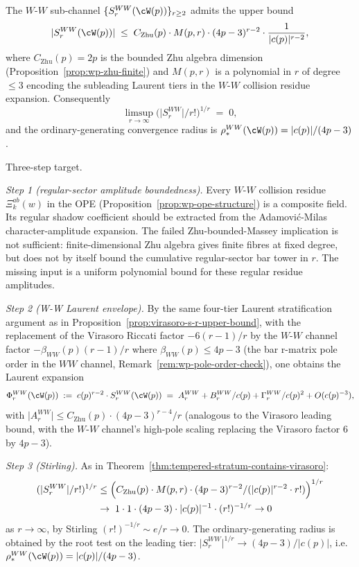 \begin{conjecture}
\label{lem:wp-ww-subchannel-tempered}
The $W$-$W$ sub-channel $\{S_r^{WW}(\cW(p))\}_{r \ge 2}$ admits the
upper bound
\[
 \lvert S_r^{WW}(\cW(p)) \rvert
 \;\le\;
 C_{\mathrm{Zhu}}(p) \cdot M(p, r) \cdot (4p - 3)^{r - 2}
 \cdot \frac{1}{\lvert c(p) \rvert^{r - 2}},
\]
where $C_{\mathrm{Zhu}}(p) = 2p$ is the bounded Zhu algebra dimension
(Proposition~\ref{prop:wp-zhu-finite}) and $M(p, r)$ is a polynomial
in $r$ of degree $\le 3$ encoding the subleading Laurent tiers in the
$W$-$W$ collision residue expansion. Consequently
\[
 \limsup_{r \to \infty}
 \bigl( \lvert S_r^{WW} \rvert / r! \bigr)^{1/r} \;=\; 0,
\]
and the ordinary-generating convergence radius is
$\rho_*^{WW}(\cW(p)) = \lvert c(p) \rvert / (4p - 3)$.
\end{conjecture}

\begin{remark}
Three-step target.

\emph{Step 1 (regular-sector amplitude boundedness).} Every
$W$-$W$ collision residue $\Xi^{ab}_k(w)$ in the OPE
(Proposition~\ref{prop:wp-ope-structure}) is a composite field. Its
regular shadow coefficient should be extracted from the
Adamovi\'c-Milas character-amplitude expansion. The failed
Zhu-bounded-Massey implication is not sufficient: finite-dimensional
Zhu algebra gives finite fibres at fixed degree, but does not by
itself bound the cumulative regular-sector bar tower in $r$.
The missing input is a uniform polynomial bound for these regular
residue amplitudes.

\emph{Step 2 (W-W Laurent envelope).} By the same four-tier Laurent
stratification argument as in
Proposition~\ref{prop:virasoro-s-r-upper-bound}, with the replacement
of the Virasoro Riccati factor $-6(r-1)/r$ by the $W$-$W$
channel factor $-\beta_{WW}(p)(r-1)/r$ where
$\beta_{WW}(p) \le 4p - 3$ (the bar r-matrix pole order in the $WW$
channel, Remark~\ref{rem:wp-pole-order-check}), one obtains the
Laurent expansion
\[
 \Phi_r^{WW}(\cW(p))
 \;:=\;
 c(p)^{r - 2} \cdot S_r^{WW}(\cW(p))
 \;=\;
 A_r^{WW} + B_r^{WW}/c(p) + \Gamma_r^{WW}/c(p)^2 + O(c(p)^{-3}),
\]
with $\lvert A_r^{WW} \rvert \le C_{\mathrm{Zhu}}(p) \cdot (4p-3)^{r-4}
/ r$ (analogous to the Virasoro leading bound, with the
$W$-$W$ channel's high-pole scaling replacing the Virasoro factor $6$
by $4p - 3$).

\emph{Step 3 (Stirling).} As in
Theorem~\ref{thm:tempered-stratum-contains-virasoro}:
\begin{align*}
 (\lvert S_r^{WW} \rvert / r!)^{1/r}
 &\le \Bigl(
 C_{\mathrm{Zhu}}(p) \cdot M(p, r) \cdot (4p-3)^{r-2}
 / (\lvert c(p) \rvert^{r-2} \cdot r!)
 \Bigr)^{1/r}
 \\
 &\to\;
 1 \cdot 1 \cdot (4p-3) \cdot \lvert c(p) \rvert^{-1}
 \cdot (r!)^{-1/r}
 \to 0
\end{align*}
as $r \to \infty$, by Stirling $(r!)^{-1/r} \sim e/r \to 0$.
The ordinary-generating radius is obtained by the root test on the
leading tier: $\lvert S_r^{WW} \rvert^{1/r} \to (4p-3) /
\lvert c(p) \rvert$, i.e.\ $\rho_*^{WW}(\cW(p)) = \lvert c(p) \rvert
/ (4p - 3)$.
\end{remark}

